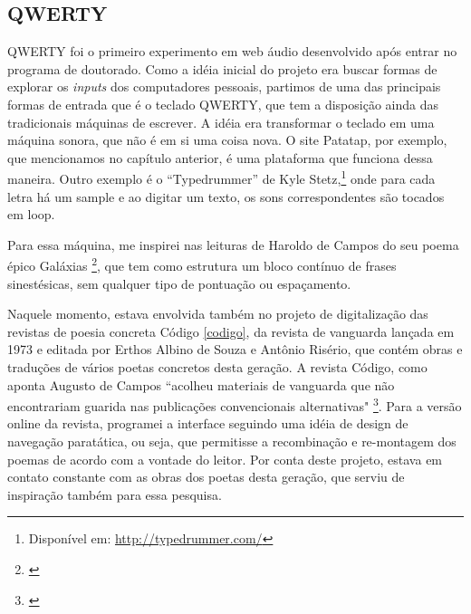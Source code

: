 \subsection{QWERTY}
\label{sec:QWERTY}
QWERTY foi o primeiro experimento em web áudio desenvolvido após entrar no programa de doutorado. Como a idéia inicial do projeto era buscar formas de explorar os \emph{inputs} dos computadores pessoais, partimos de uma das  principais formas de entrada que é o teclado QWERTY, que tem a disposição ainda das tradicionais máquinas de escrever. A idéia era transformar o teclado em uma máquina sonora, que não é em si uma coisa nova. O site Patatap, por exemplo, que mencionamos no capítulo anterior, é uma plataforma que funciona dessa maneira. Outro exemplo é o ``Typedrummer'' de Kyle Stetz,\footnote{Disponível em: \url{http://typedrummer.com/}} onde para cada letra há um sample e ao digitar um texto, os sons correspondentes são tocados em loop.


Para essa máquina, me inspirei nas leituras de Haroldo de Campos do seu poema épico Galáxias \footnote{\cite{Campos2004}}, que tem como estrutura um bloco contínuo de frases sinestésicas, sem qualquer tipo de pontuação ou espaçamento. 

Naquele momento, estava envolvida também no projeto de digitalização das revistas de poesia concreta Código \ref{codigo}, da revista de vanguarda lançada em 1973 e editada por Erthos Albino de Souza e Antônio Risério, que contém obras e traduções de vários poetas concretos desta geração. A revista Código, como aponta Augusto de Campos ``acolheu materiais de vanguarda que não encontrariam guarida nas publicações convencionais alternativas" \footnote{\cite{Scandurra2016}}. Para a versão online da revista, programei a interface seguindo uma idéia de design de navegação paratática, ou seja, que permitisse a recombinação e re-montagem dos poemas de acordo com a vontade do leitor. Por conta deste projeto, estava em contato constante com as obras dos poetas desta geração, que serviu de inspiração também para essa pesquisa.

